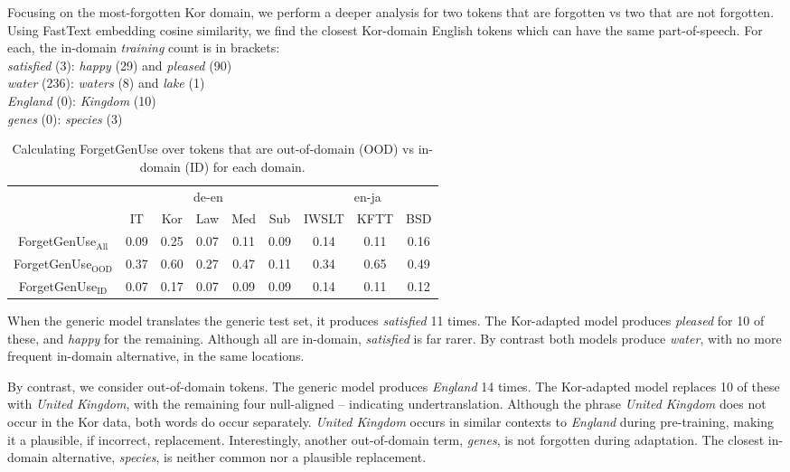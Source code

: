 \documentclass[11pt]{article}
\begin{document}
Focusing on the most-forgotten Kor domain, we perform a deeper analysis for two tokens that are forgotten vs two that are not forgotten. Using FastText embedding cosine similarity, we find the closest Kor-domain English tokens which can have the same part-of-speech. For each, the in-domain \emph{training} count is in brackets:\\
\emph{satisfied} (3): \emph{happy} (29) and \emph{pleased} (90)\\
\emph{water} (236): \emph{waters} (8) and \emph{lake} (1)\\
\emph{England} (0): \emph{Kingdom} (10) \\ %
\emph{genes} (0): \emph{species} (3)



\begin{table*}[t]
    \centering
   \small 
    \begin{tabular}{c| ccccc|ccc|}
                   &  \multicolumn{5}{c|}{de-en} &  \multicolumn{3}{c|}{en-ja}\\

         &  IT & Kor  &Law  &Med  & Sub &  IWSLT   &KFTT &BSD  \\
         \hline
        ForgetGenUse$_{\text{All}}$ &  0.09 & 0.25  & 0.07  & 0.11  & 0.09 & 0.14 &0.11 & 0.16 \\
         \hline
        ForgetGenUse$_{\text{OOD}}$ & 0.37  & 0.60  &  0.27 & 0.47 & 0.11 &   0.34 &  0.65 &0.49\\
        ForgetGenUse$_{\text{ID}}$ & 0.07 & 0.17  &  0.07 & 0.09  & 0.09 & 0.14  & 0.11& 0.12\\

    \end{tabular}
    \caption{Calculating ForgetGenUse  over tokens that are out-of-domain (OOD) vs in-domain (ID) for each domain.}
    \label{tab:forgetting-metrics-split}
\end{table*}

When the generic model translates the generic test set, it produces \emph{satisfied} 11 times. The Kor-adapted model produces \emph{pleased} for 10 of these, and \emph{happy} for the remaining. Although all are in-domain,  \emph{satisfied} is far rarer. By contrast both models produce \emph{water}, with no more frequent  in-domain alternative, in the same locations. 

By contrast, we consider out-of-domain tokens. The generic model produces \emph{England} 14 times. The Kor-adapted model replaces 10 of these with \emph{United Kingdom}, with the remaining four null-aligned -- indicating undertranslation. Although the phrase \emph{United Kingdom} does not occur in the Kor data, both words do occur  separately.   \emph{United Kingdom} occurs in similar contexts to \emph{England} during pre-training, making it a plausible, if incorrect, replacement.  Interestingly, another out-of-domain term, \emph{genes},  is not forgotten during adaptation. The closest in-domain alternative, \emph{species}, is neither common nor a plausible replacement.
\end{document}
